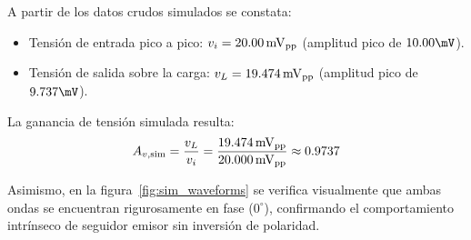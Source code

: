 A partir de los datos crudos simulados se constata:
\begin{itemize}
  \item Tensión de entrada pico a pico: $v_i = 20.00\,\mathrm{mV}_{\mathrm{pp}}$ (amplitud pico de $10.00\mV$).
  \item Tensión de salida sobre la carga: $v_L = 19.474\,\mathrm{mV}_{\mathrm{pp}}$ (amplitud pico de $9.737\mV$).
\end{itemize}

La ganancia de tensión simulada resulta:
\begin{equation}
  A_{v,\mathrm{sim}} = \frac{v_L}{v_i} = \frac{19.474\,\mathrm{mV}_{\mathrm{pp}}}{20.000\,\mathrm{mV}_{\mathrm{pp}}} \approx 0.9737
  \label{eq:Av_simulada}
\end{equation}

Asimismo, en la figura~\ref{fig:sim_waveforms} se verifica visualmente que ambas ondas se encuentran rigurosamente en
fase ($0^\circ$), confirmando el comportamiento intrínseco de seguidor emisor sin inversión de polaridad.
